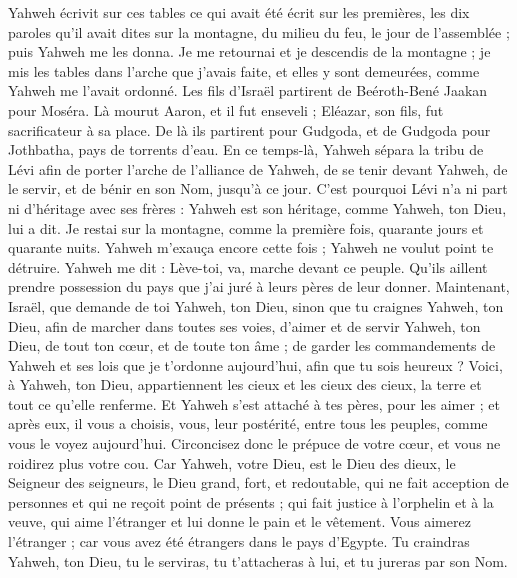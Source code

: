 \begin{multicols}{2}
Yahweh écrivit sur ces tables ce qui avait été écrit sur les premières, les dix paroles qu’il avait dites sur la montagne, du milieu du feu, le jour de l'assemblée ; puis Yahweh me les donna.
Je me retournai et je descendis de la montagne ; je mis les tables dans l'arche que j'avais faite, et elles y sont demeurées, comme Yahweh me l'avait ordonné.
Les fils d'Israël partirent de Beéroth-Bené Jaakan pour Moséra. Là mourut Aaron, et il fut enseveli ; Eléazar, son fils, fut sacrificateur à sa place.
De là ils partirent pour Gudgoda, et de Gudgoda pour Jothbatha, pays de torrents d'eau.
En ce temps-là, Yahweh sépara la tribu de Lévi afin de porter l'arche de l'alliance de Yahweh, de se tenir devant Yahweh, de le servir, et de bénir en son Nom, jusqu'à ce jour.
C'est pourquoi Lévi n'a ni part ni d'héritage avec ses frères : Yahweh est son héritage, comme Yahweh, ton Dieu, lui a dit.
Je restai sur la montagne, comme la première fois, quarante jours et quarante nuits. Yahweh m'exauça encore cette fois ; Yahweh ne voulut point te détruire.
Yahweh me dit : Lève-toi, va, marche devant ce peuple. Qu'ils aillent prendre possession du pays que j'ai juré à leurs pères de leur donner.
Maintenant, Israël, que demande de toi Yahweh, ton Dieu, sinon que tu craignes Yahweh, ton Dieu, afin de marcher dans toutes ses voies, d’aimer et de servir Yahweh, ton Dieu, de tout ton cœur, et de toute ton âme ;
de garder les commandements de Yahweh et ses lois que je t’ordonne aujourd'hui, afin que tu sois heureux ?
Voici, à Yahweh, ton Dieu, appartiennent les cieux et les cieux des cieux, la terre et tout ce qu’elle renferme.
Et Yahweh s’est attaché à tes pères, pour les aimer ; et après eux, il vous a choisis, vous, leur postérité, entre tous les peuples, comme vous le voyez aujourd'hui.
Circoncisez donc le prépuce de votre cœur, et vous ne roidirez plus votre cou.
Car Yahweh, votre Dieu, est le Dieu des dieux, le Seigneur des seigneurs, le Dieu grand, fort, et redoutable, qui ne fait acception de personnes et qui ne reçoit point de présents ;
qui fait justice à l'orphelin et à la veuve, qui aime l'étranger et lui donne le pain et le vêtement.
Vous aimerez l'étranger ; car vous avez été étrangers dans le pays d'Egypte.
Tu craindras Yahweh, ton Dieu, tu le serviras, tu t'attacheras à lui, et tu jureras par son Nom.

\end{multicols}
